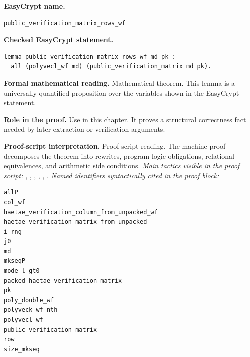 \begin{formaltheorem}
\noindent\textbf{EasyCrypt name.}
\begin{lstlisting}[language=EasyCrypt,basicstyle=\ttfamily\scriptsize]
public_verification_matrix_rows_wf
\end{lstlisting}
\noindent\textbf{Checked EasyCrypt statement.}
\begin{lstlisting}[language=EasyCrypt,basicstyle=\ttfamily\scriptsize]
lemma public_verification_matrix_rows_wf md pk :
  all (polyvecl_wf md) (public_verification_matrix md pk).
\end{lstlisting}
\noindent\textbf{Formal mathematical reading.}
Mathematical theorem. This lemma is a universally quantified proposition over the variables shown in the EasyCrypt statement.

\noindent\textbf{Role in the proof.}
Use in this chapter. It proves a structural correctness fact needed by later extraction or verification arguments.

\noindent\textbf{Proof-script interpretation.}
Proof-script reading. The machine proof decomposes the theorem into rewrites, program-logic obligations, relational equivalences, and arithmetic side conditions.
\emph{Main tactics visible in the proof script:} , , , , , .
\emph{Named identifiers syntactically cited in the proof block:}
\begin{lstlisting}[language=EasyCrypt,basicstyle=\ttfamily\scriptsize]
allP
col_wf
haetae_verification_column_from_unpacked_wf
haetae_verification_matrix_from_unpacked
i_rng
j0
md
mkseqP
mode_l_gt0
packed_haetae_verification_matrix
pk
poly_double_wf
polyveck_wf_nth
polyvecl_wf
public_verification_matrix
row
size_mkseq
\end{lstlisting}

\end{formaltheorem}


